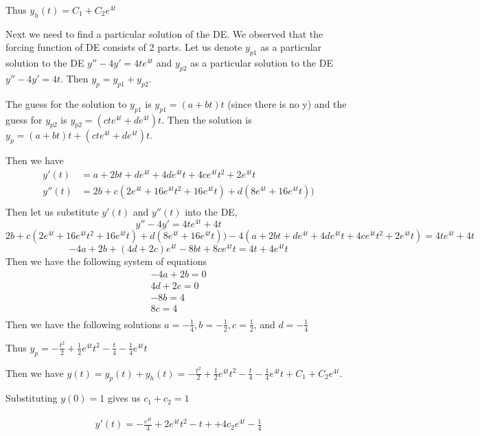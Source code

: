 Thus $y_h(t) = C_1+C_2e^{4t}$

Next we need to find a particular solution of the DE. We observed that the forcing function of DE consists of 2 parts. Let us denote $y_{p1}$ as a particular solution to the DE $y''-4y' = 4te^{4t}$ and $y_{p2}$ as a particular solution to the DE $y''-4y' = 4t$. Then $y_p = y_{p1}+y_{p2}$.

The guess for the solution to $y_{p1}$ is $y_{p1} = (a+bt)t$ (since there is no y) and the guess for $y_{p2}$ is $y_{p2} = (cte^{4t}+de^{4t})t$. Then the solution is $y_p = (a+bt)t + (cte^{4t}+de^{4t})t$.

Then we have
\begin{align*}
	y'(t) &= a + 2bt + de^{4t}+4de^{4t}t+4ce^{4t}t^2+2e^{4t}t\\
	y''(t)&=2b+c(2e^{4t}+16e^{4t}t^2+16e^{4t}t)+d(8e^{4t}+16e^{4t}t))\\
\end{align*}
Then let us substitute $y'(t)$ and $y''(t)$ into the DE,
\begin{equation*}
	y''-4y' = 4te^{4t} + 4t
\end{equation*}
\begin{equation*}
	2b+c(2e^{4t}+16e^{4t}t^2+16e^{4t}t)+d(8e^{4t}+16e^{4t}t))-4(a + 2bt + de^{4t}+4de^{4t}t+4ce^{4t}t^2+2e^{4t}t) = 4te^{4t} + 4t
\end{equation*}
\begin{equation*}
	-4a+2b+(4d+2c)e^{4t}-8bt+8ce^{4t}t = 4t+4e^{4t}t
\end{equation*}
Then we have the following system of equations
\begin{align*}
	-4a+2b = 0\\
	4d + 2c = 0\\
	-8 b = 4\\
	8c = 4\\
\end{align*}
Then we have the following solutions $a = - \frac{1}{4}, b = - \frac{1}{2}, c = \frac{1}{2}$, and $d = -\frac{1}{4}$

Thus $y_p = -\frac{t^2}{2}+\frac{1}{2}e^{4t}t^2-\frac{t}{4}-\frac{1}{4}e^{4t}t$

Then we have $y(t) = y_p(t) + y_h(t)=  -\frac{t^2}{2}+\frac{1}{2}e^{4t}t^2-\frac{t}{4}-\frac{1}{4}e^{4t}t + C_1+C_2e^{4t}$.

Substituting $y(0) = 1$ gives us $c_1+c_2 = 1$

\begin{align}
	y'(t) = - \frac{e^{4t}}{4} + 2e^{4t}t^2-t++4c_2e^{4t} - \frac{1}{4}
\end{align}


